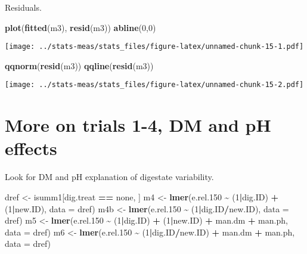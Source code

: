 \documentclass[
]{article}
\newenvironment{Shaded}{\begin{snugshade}}{\end{snugshade}}
\newcommand{\AttributeTok}[1]{\textcolor[rgb]{0.13,0.29,0.53}{#1}}
\newcommand{\DecValTok}[1]{\textcolor[rgb]{0.00,0.00,0.81}{#1}}
\newcommand{\FloatTok}[1]{\textcolor[rgb]{0.00,0.00,0.81}{#1}}
\newcommand{\FunctionTok}[1]{\textcolor[rgb]{0.13,0.29,0.53}{\textbf{#1}}}
\newcommand{\NormalTok}[1]{#1}
\newcommand{\OtherTok}[1]{\textcolor[rgb]{0.56,0.35,0.01}{#1}}
\newcommand{\SpecialCharTok}[1]{\textcolor[rgb]{0.81,0.36,0.00}{\textbf{#1}}}
\newcommand{\StringTok}[1]{\textcolor[rgb]{0.31,0.60,0.02}{#1}}
\begin{document}
Residuals.

\begin{Shaded}
\begin{Highlighting}[]
\FunctionTok{plot}\NormalTok{(}\FunctionTok{fitted}\NormalTok{(m3), }\FunctionTok{resid}\NormalTok{(m3))}
\FunctionTok{abline}\NormalTok{(}\DecValTok{0}\NormalTok{,}\DecValTok{0}\NormalTok{)}
\end{Highlighting}
\end{Shaded}

\texttt{[image: ../stats-meas/stats\_files/figure-latex/unnamed-chunk-15-1.pdf]}

\begin{Shaded}
\begin{Highlighting}[]
\FunctionTok{qqnorm}\NormalTok{(}\FunctionTok{resid}\NormalTok{(m3))}
\FunctionTok{qqline}\NormalTok{(}\FunctionTok{resid}\NormalTok{(m3))}
\end{Highlighting}
\end{Shaded}

\texttt{[image: ../stats-meas/stats\_files/figure-latex/unnamed-chunk-15-2.pdf]}

\section{More on trials 1-4, DM and pH
effects}\label{more-on-trials-1-4-dm-and-ph-effects}

Look for DM and pH explanation of digestate variability.

\begin{Shaded}
\begin{Highlighting}[]
\NormalTok{dref }\OtherTok{\textless{}{-}}\NormalTok{ isumm1[dig.treat }\SpecialCharTok{==} \StringTok{\textquotesingle{}none\textquotesingle{}}\NormalTok{, ]}
\NormalTok{m4 }\OtherTok{\textless{}{-}} \FunctionTok{lmer}\NormalTok{(e.rel}\FloatTok{.150} \SpecialCharTok{\textasciitilde{}}\NormalTok{ (}\DecValTok{1}\SpecialCharTok{|}\NormalTok{dig.ID) }\SpecialCharTok{+}\NormalTok{ (}\DecValTok{1}\SpecialCharTok{|}\NormalTok{new.ID), }\AttributeTok{data =}\NormalTok{ dref)}
\NormalTok{m4b }\OtherTok{\textless{}{-}} \FunctionTok{lmer}\NormalTok{(e.rel}\FloatTok{.150} \SpecialCharTok{\textasciitilde{}}\NormalTok{ (}\DecValTok{1}\SpecialCharTok{|}\NormalTok{dig.ID}\SpecialCharTok{/}\NormalTok{new.ID), }\AttributeTok{data =}\NormalTok{ dref)}
\NormalTok{m5 }\OtherTok{\textless{}{-}} \FunctionTok{lmer}\NormalTok{(e.rel}\FloatTok{.150} \SpecialCharTok{\textasciitilde{}}\NormalTok{ (}\DecValTok{1}\SpecialCharTok{|}\NormalTok{dig.ID) }\SpecialCharTok{+}\NormalTok{ (}\DecValTok{1}\SpecialCharTok{|}\NormalTok{new.ID) }\SpecialCharTok{+}\NormalTok{ man.dm }\SpecialCharTok{+}\NormalTok{ man.ph, }\AttributeTok{data =}\NormalTok{ dref)}
\NormalTok{m6 }\OtherTok{\textless{}{-}} \FunctionTok{lmer}\NormalTok{(e.rel}\FloatTok{.150} \SpecialCharTok{\textasciitilde{}}\NormalTok{ (}\DecValTok{1}\SpecialCharTok{|}\NormalTok{dig.ID}\SpecialCharTok{/}\NormalTok{new.ID) }\SpecialCharTok{+}\NormalTok{ man.dm }\SpecialCharTok{+}\NormalTok{ man.ph, }\AttributeTok{data =}\NormalTok{ dref)}
\end{Highlighting}
\end{Shaded}
\end{document}
